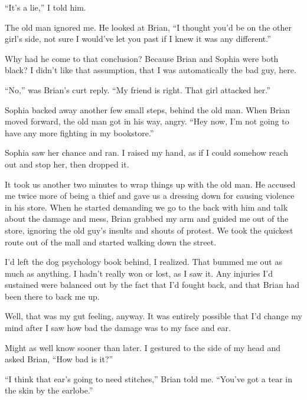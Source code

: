 ``It's a lie,'' I told him.



The old man ignored me.  He looked at Brian, ``I thought you'd be on the other girl's side, not sure I would've let you past if I knew it was any different.''



Why had he come to that conclusion?  Because Brian and Sophia were both black?  I didn't like that assumption, that I was automatically the bad guy, here.



``No,'' was Brian's curt reply.  ``My friend is right.  That girl attacked her.''



Sophia backed away another few small steps, behind the old man.  When Brian moved forward, the old man got in his way, angry.  ``Hey now, I'm not going to have any more fighting in my bookstore.''



Sophia saw her chance and ran.  I raised my hand, as if I could somehow reach out and stop her, then dropped it.



It took us another two minutes to wrap things up with the old man.  He accused me twice more of being a thief and gave us a dressing down for causing violence in his store.  When he started demanding we go to the back with him and talk about the damage and mess, Brian grabbed my arm and guided me out of the store, ignoring the old guy's insults and shouts of protest.  We took the quickest route out of the mall and started walking down the street.



I'd left the dog psychology book behind, I realized.  That bummed me out as much as anything.  I hadn't really won or lost, as I saw it.  Any injuries I'd sustained were balanced out by the fact that I'd fought back, and that Brian had been there to back me up.



Well, that was my gut feeling, anyway.  It was entirely possible that I'd change my mind after I saw how bad the damage was to my face and ear.



Might as well know sooner than later.  I gestured to the side of my head and asked Brian, ``How bad is it?''



``I think that ear's going to need stitches,'' Brian told me.  ``You've got a tear in the skin by the earlobe.''



